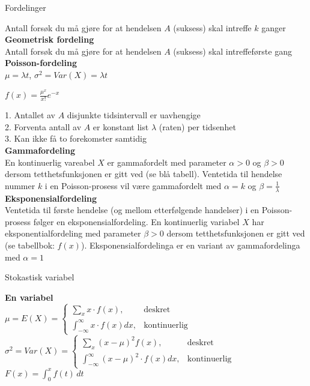 \documentclass[final,hyperref={pdfpagelabels=false}]{beamer}
\begin{document}
\begin{frame}{}
\begin{columns}[t]
\begin{column}{.25\linewidth}
\begin{block}{\center\normalsize Fordelinger}
{					Antall forsøk du må gjøre for at hendelsen $A$ (suksess) skal intreffe $k$ ganger\\
					\textbf{Geometrisk fordeling}\\
					Antall forsøk du må gjøre for at hendelsen $A$ (suksess) skal intreffeførste gang\\
					\textbf{Poisson-fordeling}\\
					$\mu = \lambda t$, $\sigma^2=Var(X)=\lambda t$\par
					$f(x)=\frac{\mu^x}{x!}e^{-x}$\par
					1. Antallet av $A$ disjunkte tidsintervall er uavhengige\\
					2. Forventa antall av $A$ er konstant list $\lambda$ (raten) per tidsenhet\\
					3. Kan ikke få to forekomster samtidig\\
					\textbf{Gammafordeling}\\
					En kontinuerlig vareabel $X$ er gammafordelt med parameter $\alpha > 0$ og $\beta > 0$ dersom tetthetsfunksjonen er gitt ved (se blå tabell). Ventetida til hendelse nummer $k$ i en Poisson-prosess vil være gammafordelt med $\alpha=k$ og $\beta=\frac{1}{\lambda}$\\
					\textbf{Eksponensialfordeling}\\
					Ventetida til første hendelse (og mellom etterfølgende handelser) i en Poisson-prosess følger en eksponensialfordeling. En kontinuerlig variabel $X$ har eksponentialfordeling med parameter $\beta > 0$ dersom tetthetsfunksjonen er gitt ved (se tabellbok: $f(x)$). Eksponensialfordelinga er en variant av gammafordelinga med $\alpha=1$\\
				}
				\center\normalsize Stokastisk variabel\\
				{\footnotesize\raggedright
					\textbf{En variabel}\\
					$\mu=E(X)=\begin{cases}
						\sum_x x\cdot f(x), &\text{deskret}\\
						\int_{-\infty}^\infty x\cdot f(x) dx, &\text{kontinuerlig}
					\end{cases}$\\
					$\sigma^2=Var(X)=\begin{cases}
						\sum_x (x-\mu)^2f(x), &\text{deskret}\\
						\int_{-\infty}^\infty (x-\mu)^2\cdot f(x) dx, &\text{kontinuerlig}
					\end{cases}$\\
					$F(x)=\int_0^xf(t)\,dt$\\
}
\end{block}
\end{column}
\end{columns}
\end{frame}
\end{document}
